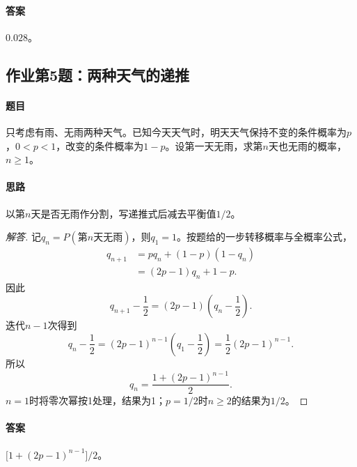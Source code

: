 \paragraph{答案}$0.028$。

\subsection{作业第5题：两种天气的递推}\label{ex:w03-h5}
\paragraph{题目}
只考虑有雨、无雨两种天气。已知今天天气时，明天天气保持不变的条件概率为$p$，$0<p<1$，改变的条件概率为$1-p$。设第一天无雨，求第$n$天也无雨的概率，$n\geq1$。
\paragraph{思路}以第$n$天是否无雨作分割，写递推式后减去平衡值$1/2$。
\begin{proof}[解答]
记$q_n=P(\text{第$n$天无雨})$，则$q_1=1$。按题给的一步转移概率与全概率公式，
\begin{align*}
q_{n+1}&=pq_n+(1-p)(1-q_n)\\
&=(2p-1)q_n+1-p.
\end{align*}
因此
\[q_{n+1}-\frac12=(2p-1)\left(q_n-\frac12\right).\]
迭代$n-1$次得到
\[q_n-\frac12=(2p-1)^{n-1}\left(q_1-\frac12\right)=\frac12(2p-1)^{n-1}.\]
所以
\[q_n=\frac{1+(2p-1)^{n-1}}2.\]
$n=1$时将零次幂按1处理，结果为1；$p=1/2$时$n\geq2$的结果为$1/2$。
\end{proof}
\paragraph{答案}$\bigl[1+(2p-1)^{n-1}\bigr]/2$。
